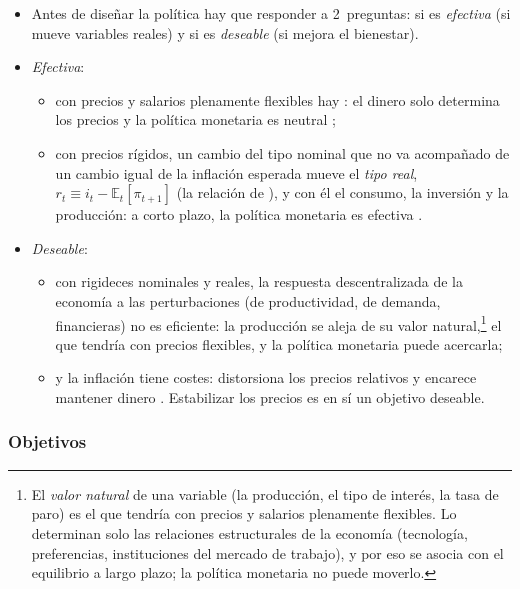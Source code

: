 \documentclass[11pt]{article}
\begin{document}
\begin{itemize}
\item Antes de diseñar la política hay que responder a 2~preguntas: si es \emph{efectiva} (si mueve variables reales) y si es \emph{deseable} (si mejora el bienestar).
\item \emph{Efectiva}:
  \begin{itemize}
  \item con precios y salarios plenamente flexibles hay : el dinero solo determina los precios y la política monetaria es neutral ;
  \item con precios rígidos, un cambio del tipo nominal que no va acompañado de un cambio igual de la inflación esperada mueve el \emph{tipo real}, $r_t\equiv i_t-\mathbb{E}_t[\pi_{t+1}]$ (la relación de ), y con él el consumo, la inversión y la producción: a corto plazo, la política monetaria es efectiva .
  \end{itemize}
\item \emph{Deseable}:
  \begin{itemize}
  \item con rigideces nominales y reales\nocite{BallRomer1990Real}, la respuesta descentralizada de la economía a las perturbaciones (de productividad, de demanda, financieras) no es eficiente: la producción se aleja de su valor natural,\footnote{El \emph{valor natural} de una variable (la producción, el tipo de interés, la tasa de paro) es el que tendría con precios y salarios plenamente flexibles. Lo determinan solo las relaciones estructurales de la economía (tecnología, preferencias, instituciones del mercado de trabajo), y por eso se asocia con el equilibrio a largo plazo; la política monetaria no puede moverlo.} el que tendría con precios flexibles, y la política monetaria puede acercarla;
  \item y la inflación tiene costes: distorsiona los precios relativos y encarece mantener dinero . Estabilizar los precios es en sí un objetivo deseable.
  \end{itemize}
\end{itemize}

\subsubsection{Objetivos}\label{sec:objetivos}
\end{document}
